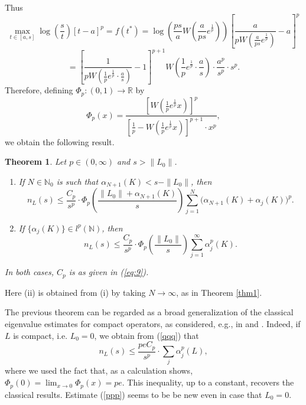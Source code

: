\documentclass[12pt,a4paper]{article}
\newtheorem{theorem}{Theorem}[section]
\theoremstyle{definition}
\theoremstyle{remark}
\numberwithin{equation}{section}
\newcommand{\mr}{{\mathbb R}}
\newcommand{\mn}{{\mathbb N}}
\begin{document}
Thus
$$\max_{t\in [a,s]}\log\left(\frac{s}{t}\right)[t-a]^p=f(t^*)=\log\left(\frac{ps}{a}W\left(\frac{a}{ps}e^{\frac{1}{p} }\right)\right)\left[\frac{a}{pW\left(\frac{a}{ps}e^{\frac{1}{p} }\right)}-a\right]^p $$ 
$$=\left[\frac{1}{pW\left(\frac{1}{p}e^{\frac{1}{p} }\cdot \frac{a}{s}\right)}-1\right]^{p+1}W\left(\frac{1}{p}e^{\frac{1}{p} }\cdot \frac{a}{s}\right) \cdot \frac{a^p}{s^p}\cdot s^p.$$
Therefore, defining $\Phi_p:(0,1)\rightarrow \mr$ by 
\begin{equation}
  \label{eq:11}
\Phi_p(x)=\frac{\left[W\left(\frac{1}{p}e^{\frac{1}{p} }x\right)\right]^p}{\left[\frac{1}{p}-W\left(\frac{1}{p}e^{\frac{1}{p} }x\right)\right]^{p+1}\cdot x^p},  
\end{equation}
we obtain the following result.
\begin{theorem}\label{thm:ball}
Let $p \in (0,\infty)$ and $s>\|L_0\|$. 
\begin{enumerate}
    \item[(i)] If $N\in\mathbb{N}_0$ is such that $\alpha_{N+1}(K)<s-\|L_0\|$, then
\begin{equation}\label{ppp}
n_L(s) \leq \frac{C_p}{s^p}\cdot \Phi_p\left(\frac{\|L_0\|+\alpha_{N+1}(K)}{s}\right)  \sum_{j=1}^N\Big( \alpha_{N+1}(K) + \alpha_{j}(K) \Big)^p.
  \end{equation}
 \item[(ii)] If $\{\alpha_j(K)\} \in l^p(\mn)$, then
\begin{equation}\label{qqq}
n_L(s) \leq \frac{C_p}{s^p} \cdot  \Phi_p\left(\frac{\|L_0\|}{s}\right)\sum_{j=1}^\infty\alpha_j^p(K).
  \end{equation}
\end{enumerate}
In both cases, $C_p$ is as given in (\ref{eq:9}). 
\end{theorem}
Here (ii) is obtained from (i) by taking $N\rightarrow \infty$, as in Theorem \ref{thm1}.

The previous theorem can be regarded as a broad generalization of the classical eigenvalue estimates for compact operators, as considered, e.g., in \cite{koenig} and \cite{pietsch}. 
Indeed, if $L$ is compact, i.e. $L_0=0$, we obtain from (\ref{qqq}) that  
\begin{equation} \label{eq:rst}
n_L(s) \leq \frac{p e C_p}{s^p} \cdot  \sum_{j}\alpha_j^p(L),
  \end{equation}
where we used the fact that, as a calculation shows, $\Phi_p(0)=\lim_{x\rightarrow 0}\Phi_p(x)=pe$. This inequality, 
 up to a constant, recovers the classical results. Estimate (\ref{ppp}) seems to be be new even in case that $L_0=0$. 
\end{document}
